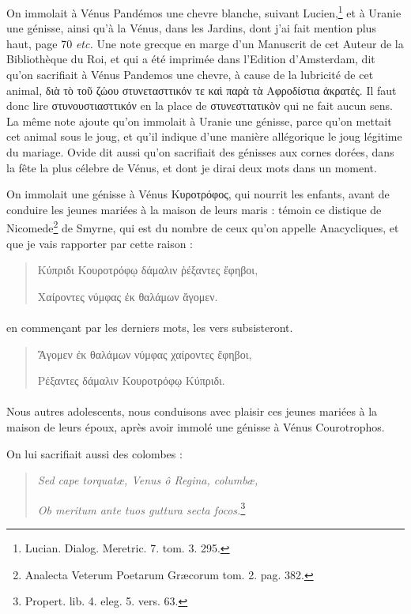 \documentclass[a4paper, 11pt, oneside, polutonikogreek, french]{article}
\begin{document}
On immolait à Vénus Pandémos une chevre blanche, suivant Lucien,\footnote{Lucian. Dialog. Meretric. 7. tom. 3. 295.} et à Uranie une génisse, ainsi qu'à la Vénus, dans les Jardins, dont j'ai fait mention plus haut, page 70 \emph{etc.} Une note grecque en marge d'un Manuscrit de cet Auteur de la Bibliothèque du Roi, et qui a été imprimée dans l'Edition d'Amsterdam, dit qu'on sacrifiait à Vénus Pandemos une chevre, à cause de la lubricité de cet animal, διὰ τὸ τοῦ ζώου στυνετασττικόν τε καὶ παρὰ τὰ Αφροδίστια ἀκρατές. Il faut donc lire στυνουστιασττικόν en la place de στυνεσττατικὸν qui ne fait aucun sens. La même note ajoute qu'on immolait à Uranie une génisse, parce qu'on mettait cet animal sous le joug, et qu'il indique d'une manière allégorique le joug légitime du mariage. Ovide dit aussi qu'on sacrifiait des génisses aux cornes dorées, dans la fête la plus célebre de Vénus, et dont je dirai deux mots dans un moment.

On immolait une génisse à Vénus Κυροτρόφος, qui nourrit les enfants, avant de conduire les jeunes mariées à la maison de leurs maris : témoin ce distique de Nicomede\footnote{Analecta Veterum Poetarum Græcorum tom. 2. pag. 382.} de Smyrne, qui est du nombre de ceux qu'on appelle Anacycliques, et que je vais rapporter par cette raison :
\begin{quotation}
Κύπριδι Κουροτρόφῳ δάμαλιν ῥέξαντες ἔφηβοι,

\hspace*{5mm}Χαίροντες νύμφας ἐκ θαλάμων ἄγομεν.
\end{quotation}
\paragraph{}
en commençant par les derniers mots, les vers subsisteront.
\begin{quotation}
Ἄγομεν ἐκ θαλάμων νύμφας χαίροντες ἔφηβοι,

\hspace*{5mm}Ρέξαντες δάμαλιν Κουροτρόφῳ Κύπριδι.
\end{quotation}
\paragraph{}
Nous autres adolescents, nous conduisons avec plaisir ces jeunes mariées à la maison de leurs époux, après avoir immolé une génisse à Vénus Courotrophos.

On lui sacrifiait aussi des colombes :
\begin{quotation}
\emph{Sed cape torquatæ, Venus ô Regina, columbæ,}

\hspace*{5mm}\emph{Ob meritum ante tuos guttura secta focos.}\footnote{Propert. lib. 4. eleg. 5. vers. 63.}
\end{quotation}
\end{document}
